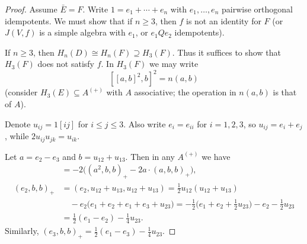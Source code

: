 \documentclass{article}
\begin{document}
\begin{proof}
Assume $\bar{E}=F$. Write $1=e_1+\cdots+e_n$ with $e_1,\dots,e_n$ pairwise orthogonal idempotents. We must show that if $n\geq 3$, then $f$ is not an identity for $F$ (or $J(V,f)$ is a simple algebra with $e_1$, or $e_1Qe_2$ idempotents).

If $n\geq 3$, then $H_n(D)\cong H_n(F)\supseteq H_3(F)$. Thus it suffices to show that $H_3(F)$ does not satisfy $f$. In $H_3(F)$ we may write
\[
[[a,b]^2,b]^2=n(a,b)
\]
(consider $H_3(E)\subseteq A^{(+)}$ with $A$ associative; the operation in $n(a,b)$ is that of $A$).

Denote $u_{ij}=1[i j]$ for $i\leq j\leq 3$. Also write $e_i=e_{ii}$ for $i=1,2,3$, so $u_{ij}=e_i+e_j$, while $2u_{ij}u_{jk}=u_{ik}$.

Let $a=e_2-e_3$ and $b=u_{12}+u_{13}$. Then in any $A^{(+)}$ we have
\begin{align*}
[a,b] &= -2\bigl((a^2,b,b)_+ - 2a\cdot(a,b,b)_+\bigr), \\
(e_2,b,b)_+ &= (e_2,u_{12}+u_{13},u_{12}+u_{13}) = \frac{1}{2}u_{12}(u_{12}+u_{13}) \\
&\quad -e_2\bigl(e_1+e_2+e_1+e_3+u_{23}\bigr) = -\frac{1}{2}\bigl(e_1+e_2+\frac{1}{2}u_{23}\bigr)-e_2-\frac{1}{2}u_{23} \\
&= \frac{1}{2}(e_1-e_2)-\frac{1}{4}u_{23}.
\end{align*}
Similarly, $(e_3,b,b)_+=\frac{1}{2}(e_1-e_3)-\frac{1}{4}u_{23}$.


\end{proof}
\end{document}
